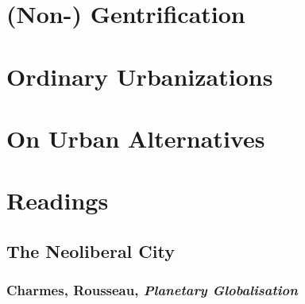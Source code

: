 \documentclass{article}
\begin{document}

\section{(Non-) Gentrification}


\section{Ordinary Urbanizations}


\section{On Urban Alternatives}


\section{Readings}

\subsection{The Neoliberal City}

\subsubsection{Charmes, Rousseau, \textit{Planetary Globalisation}}
\end{document}

